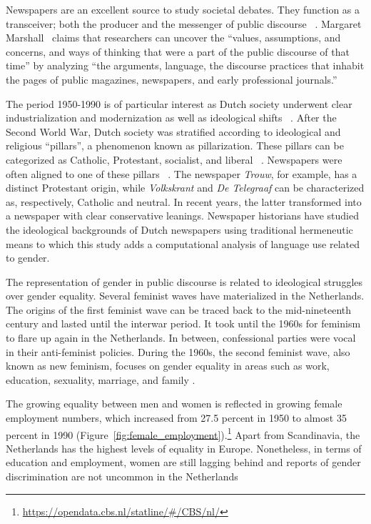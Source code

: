 \documentclass[11pt,a4paper]{article}
\begin{document}
Newspapers are an excellent source to study societal debates. They function as a transceiver; both the producer and the messenger of public discourse ~\cite{schudson_power_1982}. Margaret Marshall~ claims that researchers can uncover the ``values, assumptions, and concerns, and ways of thinking that were a part of the public discourse of that time'' by analyzing ``the arguments, language, the discourse practices that inhabit the pages of public magazines, newspapers, and early professional journals.'' 

The period 1950-1990 is of particular interest as Dutch society underwent clear industrialization and modernization as well as ideological shifts ~\cite{schot_technology_2010}. After the Second World War, Dutch society was stratified according to ideological and religious ``pillars'', a phenomenon known as pillarization. These pillars can be categorized as Catholic, Protestant, socialist, and liberal ~\cite{wintle_economic_2000}. 
Newspapers were often aligned to one of these pillars ~\cite{wijfjes_journalistiek_2004, rooij_kranten:_1974}. The newspaper \textit{Trouw}, for example, has a distinct Protestant origin, while \textit{Volkskrant} and \textit{De Telegraaf} can be characterized as, respectively, Catholic and neutral. In recent years, the latter transformed into a newspaper with clear conservative leanings. Newspaper historians have studied the ideological backgrounds of Dutch newspapers using traditional hermeneutic means to which this study adds a computational analysis of language use related to gender. 

The representation of gender in public discourse is related to ideological struggles over gender equality. Several feminist waves have materialized in the Netherlands. The origins of the first feminist wave can be traced back to the mid-nineteenth century and lasted until the interwar period. It took until the 1960s for feminism to flare up again in the Netherlands. In between, confessional parties were vocal in their anti-feminist policies. During the 1960s, the second feminist wave, also known as new feminism, focuses on gender equality in areas such as work, education, sexuality, marriage, and family \cite{ribberink_feminisme_1987}. 

The growing equality between men and women is reflected in growing female employment numbers, which increased from 27.5 percent in 1950 to almost 35 percent in 1990 (Figure~\ref{fig:female_employment}).\footnote{\url{https://opendata.cbs.nl/statline/\#/CBS/nl/}} Apart from Scandinavia, the Netherlands has the highest levels of equality in Europe. Nonetheless, in terms of education and employment, women are still lagging behind and reports of gender discrimination are not uncommon in the Netherlands ~\cite{baali_overheid_2018, ministerie_van_onderwijs_vrouwenemancipatie_2009}
\end{document}
